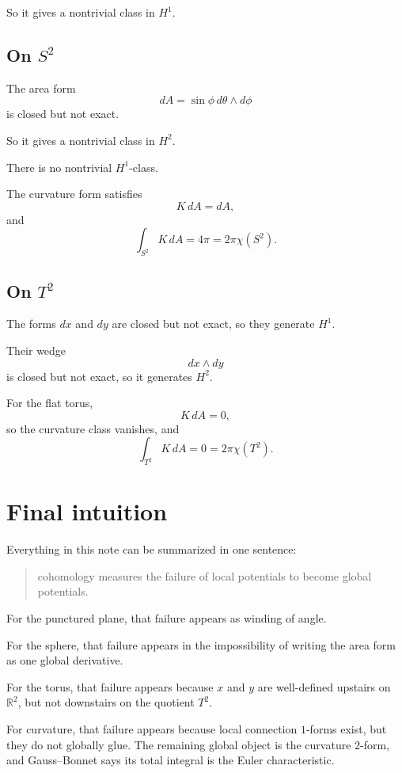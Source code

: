 \documentclass[11pt]{article}
\begin{document}
	So it gives a nontrivial class in \(H^1\).
	
	\subsection*{On \(S^2\)}
	
	The area form
	\[
	dA=\sin\phi\,d\theta\wedge d\phi
	\]
	is closed but not exact.
	
	So it gives a nontrivial class in \(H^2\).
	
	There is no nontrivial \(H^1\)-class.
	
	The curvature form satisfies
	\[
	K\,dA=dA,
	\]
	and
	\[
	\int_{S^2}K\,dA=4\pi=2\pi\chi(S^2).
	\]
	
	\subsection*{On \(T^2\)}
	
	The forms \(dx\) and \(dy\) are closed but not exact, so they generate \(H^1\).
	
	Their wedge
	\[
	dx\wedge dy
	\]
	is closed but not exact, so it generates \(H^2\).
	
	For the flat torus,
	\[
	K\,dA=0,
	\]
	so the curvature class vanishes, and
	\[
	\int_{T^2}K\,dA=0=2\pi\chi(T^2).
	\]
	
	\section{Final intuition}
	
	Everything in this note can be summarized in one sentence:
	
	\begin{quote}
		cohomology measures the failure of local potentials to become global potentials.
	\end{quote}
	
	For the punctured plane, that failure appears as winding of angle.
	
	For the sphere, that failure appears in the impossibility of writing the area form as one global derivative.
	
	For the torus, that failure appears because \(x\) and \(y\) are well-defined upstairs on \(\mathbb{R}^2\), but not downstairs on the quotient \(T^2\).
	
	For curvature, that failure appears because local connection \(1\)-forms exist, but they do not globally glue. The remaining global object is the curvature \(2\)-form, and Gauss--Bonnet says its total integral is the Euler characteristic.
	
\end{document}
